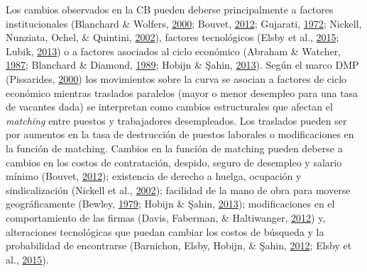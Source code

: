 \documentclass[12pt,oneside]{reedthesis}
\begin{document}
Los cambios observados en la CB pueden deberse principalmente a factores institucionales (Blanchard \& Wolfers, \protect\hyperlink{ref-Blanchard2000}{2000}; Bouvet, \protect\hyperlink{ref-Bouvet2012}{2012}; Gujarati, \protect\hyperlink{ref-Gujarati1972}{1972}; Nickell, Nunziata, Ochel, \& Quintini, \protect\hyperlink{ref-Nickell2002}{2002}), factores tecnológicos (Elsby et al., \protect\hyperlink{ref-Elsby2015}{2015}; Lubik, \protect\hyperlink{ref-Lubik2013}{2013}) o a factores asociados al ciclo económico (Abraham \& Watcher, \protect\hyperlink{ref-Abraham1987}{1987}; Blanchard \& Diamond, \protect\hyperlink{ref-Blanchard1989}{1989}; Hobijn \& Şahin, \protect\hyperlink{ref-Hobijn2013}{2013}). Según el marco DMP (Pissarides, \protect\hyperlink{ref-Pissarides2000}{2000}) los movimientos sobre la curva se asocian a factores de ciclo económico mientras traslados paralelos (mayor o menor desempleo para una tasa de vacantes dada) se interpretan como cambios estructurales que afectan el \emph{matching} entre puestos y trabajadores desempleados. Los traslados pueden ser por aumentos en la tasa de destrucción de puestos laborales o modificaciones en la función de matching. Cambios en la función de matching pueden deberse a cambios en los costos de contratación, despido, seguro de desempleo y salario mínimo (Bouvet, \protect\hyperlink{ref-Bouvet2012}{2012}); existencia de derecho a huelga, ocupación y sindicalización (Nickell et al., \protect\hyperlink{ref-Nickell2002}{2002}); facilidad de la mano de obra para moverse geográficamente (Bewley, \protect\hyperlink{ref-Bewley1979}{1979}; Hobijn \& Şahin, \protect\hyperlink{ref-Hobijn2013}{2013}); modificaciones en el comportamiento de las firmas (Davis, Faberman, \& Haltiwanger, \protect\hyperlink{ref-Haltiwanger2012}{2012}) y, alteraciones tecnológicas que puedan cambiar los costos de búsqueda y la probabilidad de encontrarse (Barnichon, Elsby, Hobijn, \& Şahin, \protect\hyperlink{ref-Barnichon2012}{2012}; Elsby et al., \protect\hyperlink{ref-Elsby2015}{2015}).
\end{document}
